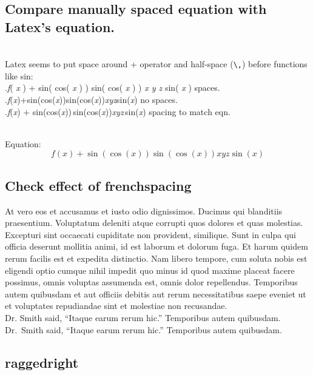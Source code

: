 \documentclass[fleqn]{article}
\begin{document}
\subsection*{Compare manually spaced equation with Latex's equation.}

\noindent\\
Latex seems to put space around + operator and half-space (\verb+\,+) before
functions like sin:
\\
.\qquad \textit{f}( \textit{x} ) + sin( cos( \textit{x} ) ) sin( cos( \textit{x} ) ) \textit{x y z} sin( \textit{x} )
    \qquad spaces. \\
.\qquad \textit{f}(\textit{x})+sin(cos(\textit{x}))sin(cos(\textit{x}))\textit{xyz}sin(\textit{x})
    \qquad no spaces. \\
.\qquad \textit{f}(\textit{x}) + sin(cos(\textit{x}))\,sin(cos(\textit{x}))\textit{xyz}\,sin(\textit{x})
    \qquad spacing to match eqn.

\noindent\\
Equation:
\[
    f(x)+\sin(\cos(x))\sin(\cos(x))xyz\sin(x)
\]

\subsection*{Check effect of frenchspacing}

At vero eos et accusamus et iusto odio dignissimos. Ducimus qui
blanditiis praesentium. Voluptatum deleniti atque corrupti quos dolores
et quas molestias. Excepturi sint occaecati cupiditate non provident,
similique. Sunt in culpa qui officia deserunt mollitia animi, id est
laborum et dolorum fuga. Et harum quidem rerum facilis est et expedita
distinctio. Nam libero tempore, cum soluta nobis est eligendi optio
cumque nihil impedit quo minus id quod maxime placeat facere possimus,
omnis voluptas assumenda est, omnis dolor repellendus. Temporibus autem
quibusdam et aut officiis debitis aut rerum necessitatibus saepe eveniet
ut et voluptates repudiandae sint et molestiae non recusandae. \\
Dr. Smith said, ``Itaque earum rerum hic.'' Temporibus autem quibusdam. \\
Dr.~Smith said, ``Itaque earum rerum hic.'' Temporibus autem quibusdam.

\subsection*{raggedright}
\end{document}
